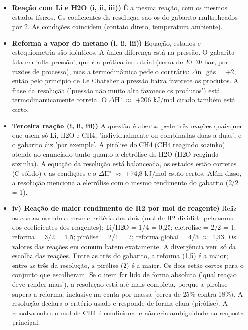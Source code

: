 \documentclass{article}%
\begin{document}
\begin{itemize}%
\item%
\textbf{Reação com Li e H2O (i, ii, iii))} É a mesma reação, com os mesmos estados físicos. Os coeficientes da resolução são os do gabarito multiplicados por 2. As condições coincidem (contato direto, temperatura ambiente).%
\item%
\textbf{Reforma a vapor do metano (i, ii, iii))} Equação, estados e estequiometria são idênticos. A única diferença está na pressão. O gabarito fala em 'alta pressão', que é a prática industrial (cerca de 20--30 bar, por razões de processo), mas a termodinâmica pede o contrário: $\Delta$n\_gás = +2, então pelo princípio de Le Chatelier a pressão baixa favorece os produtos. A frase da resolução ('pressão não muito alta favorece os produtos') está termodinamicamente correta. O $\Delta$H$^\circ$ $\approx$ +206 kJ/mol citado também está certo.%
\item%
\textbf{Terceira reação (i, ii, iii))} A questão é aberta: pede três reações quaisquer que usem só Li, H2O e CH4, 'individualmente ou combinadas duas a duas', e o gabarito diz 'por exemplo'. A pirólise do CH4 (CH4 reagindo sozinho) atende ao enunciado tanto quanto a eletrólise da H2O (H2O reagindo sozinha). A equação da resolução está balanceada, os estados estão corretos (C sólido) e as condições e o $\Delta$H$^\circ$ $\approx$ +74,8 kJ/mol estão certos. Além disso, a resolução menciona a eletrólise com o mesmo rendimento do gabarito (2/2 = 1).%
\item%
\textbf{iv) Reação de maior rendimento de H2 por mol de reagente)} Refiz as contas usando o mesmo critério dos dois (mol de H2 dividido pela soma dos coeficientes dos reagentes): Li/H2O = 1/4 = 0,25; eletrólise = 2/2 = 1; reforma = 3/2 = 1,5; pirólise = 2/1 = 2; reforma global = 4/3 $\approx$ 1,33. Os valores das reações em comum batem exatamente. A divergência vem só da escolha das reações. Entre as três do gabarito, a reforma (1,5) é a maior; entre as três da resolução, a pirólise (2) é a maior. Os dois estão certos para o conjunto que escolheram. Se o item for lido de forma absoluta ('qual reação deve render mais'), a resolução está até mais completa, porque a pirólise supera a reforma, inclusive na conta por massa (cerca de 25\% contra 18\%). A resolução declara o critério usado e responde de forma clara (pirólise). A ressalva sobre o mol de CH4 é condicional e não cria ambiguidade na resposta principal.%
\end{itemize}%
\end{document}
